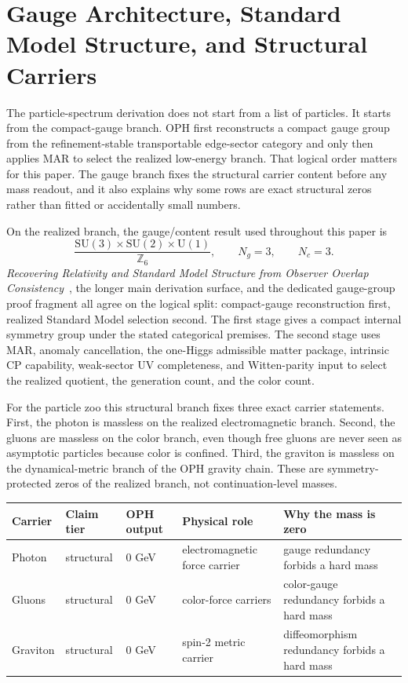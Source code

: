 \documentclass[11pt]{article}
\newcommand{\SU}{\mathrm{SU}}
\newcommand{\U}{\mathrm{U}}
\begin{document}
\section{Gauge Architecture, Standard Model Structure, and Structural Carriers}

The particle-spectrum derivation does not start from a list of particles. It starts from the
compact-gauge branch. OPH first reconstructs a compact gauge
group from the refinement-stable transportable edge-sector category and only then applies MAR to
select the realized low-energy branch. That logical order matters for this paper. The
gauge branch fixes the structural carrier content before any mass readout, and it also explains
why some rows are exact structural zeros rather than fitted or accidentally small numbers.

On the realized branch, the gauge/content result used throughout this paper is
\[
\frac{\SU(3)\times\SU(2)\times\U(1)}{\mathbb Z_6},
\qquad
N_g=3,
\qquad
N_c=3.
\]
\emph{Recovering Relativity and Standard Model Structure from Observer Overlap Consistency}~\cite{ophcompact}, the longer main derivation surface, and the dedicated gauge-group proof
fragment all agree on the logical split: compact-gauge reconstruction first, realized Standard
Model selection second. The first stage gives a compact internal symmetry group under the stated
categorical premises. The second stage uses MAR, anomaly cancellation, the one-Higgs admissible
matter package, intrinsic CP capability, weak-sector UV completeness, and Witten-parity input to
select the realized quotient, the generation count, and the color count.

For the particle zoo this structural branch fixes three exact carrier statements.
First, the photon is massless on the realized electromagnetic branch. Second, the gluons are
massless on the color branch, even though free gluons are never seen as asymptotic particles
because color is confined. Third, the graviton is massless on the dynamical-metric branch of the
OPH gravity chain. These are symmetry-protected zeros of the realized branch, not continuation-level
masses.

\begin{table}[h]
\centering
\small
\begin{tabular}{@{}>{\raggedright\arraybackslash}p{}>{\raggedright\arraybackslash}p{}>{\raggedright\arraybackslash}p{}>{\raggedright\arraybackslash}p{}>{\raggedright\arraybackslash}p{}@{}}
\toprule
Carrier & Claim tier & OPH output & Physical role & Why the mass is zero \\
\midrule
Photon & structural & \(0\) GeV & electromagnetic force carrier & gauge redundancy forbids a hard mass \\
Gluons & structural & \(0\) GeV & color-force carriers & color-gauge redundancy forbids a hard mass \\
Graviton & structural & \(0\) GeV & spin-2 metric carrier & diffeomorphism redundancy forbids a hard mass \\
\bottomrule
\end{tabular}
\end{table}
\end{document}
